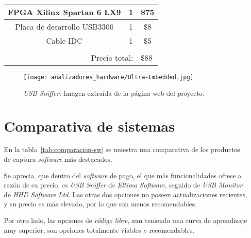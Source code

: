 \begin{itemize}
\begin{table}[hbtp]
\begin{tabular}{|c|c|c|}
            FPGA Xilinx Spartan 6 LX9 &
            1 & \$75 \\ \hline

            Placa de desarrollo USB3300 &
            1 &
            \$8 \\ \hline

            Cable IDC &
            1 &
            \$5 \\ \hline

            \multicolumn{1}{l}{} &
            \multicolumn{1}{l}{} &
            \multicolumn{1}{l}{} \\

            \multicolumn{2}{r}{Precio total:} &
            \multicolumn{1}{l}{\$88} \\
        \end{tabular}
    \end{table}

    \begin{figure}[hbtp]
        \centering
        \texttt{[image: analizadores\_hardware/Ultra-Embedded.jpg]}
        \caption{\emph{USB Sniffer}. Imagen extraída de la página web del proyecto.}
        \label{fig:ultra-embedded}
    \end{figure}
\end{itemize}



\section{Comparativa de sistemas}
En la tabla~\ref{tab:comparacion-sw} se muestra una comparativa de los productos de captura \emph{software} más destacados.

Se aprecia, que dentro del \emph{software} de pago, el que más funcionalidades ofrece a razón de su precio, es \emph{USB Sniffer} de \emph{Eltima Software}, seguido de \emph{USB Monitor} de \emph{HHD Software Ltd}. Las otras dos opciones no poseen actualizaciones recientes, y su precio es más elevado, por lo que son menos recomendables.

Por otro lado, las opciones de \emph{código libre}, aun teniendo una curva de aprendizaje muy superior, son opciones totalmente viables y recomendables.

